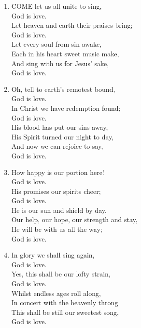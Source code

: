 \begin{enumerate}
    \item COME let us all unite to sing, \\
        God is love. \\
        Let heaven and earth their praises bring; \\
        God is love. \\
        Let every soul from sin awake, \\
        Each in his heart sweet music make, \\
        And sing with us for Jesus' sake, \\
        God is love.

    \item Oh, tell to earth's remotest bound, \\
        God is love. \\
        In Christ we have redemption found; \\
        God is love. \\
        His blood has put our sins away, \\
        His Spirit turned our night to day, \\
        And now we can rejoice to say, \\
        God is love.

    \item How happy is our portion here! \\
        God is love. \\
        His promises our spirits cheer; \\
        God is love. \\
        He is our sun and shield by day, \\
        Our help, our hope, our strength and stay, \\
        He will be with us all the way; \\
        God is love.

    \item In glory we shall sing again, \\
        God is love. \\
        Yes, this shall be our lofty strain, \\
        God is love. \\
        Whilst endless ages roll along, \\
        In concert with the heavenly throng \\
        This shall be still our sweetest song, \\
        God is love.

\end{enumerate}

